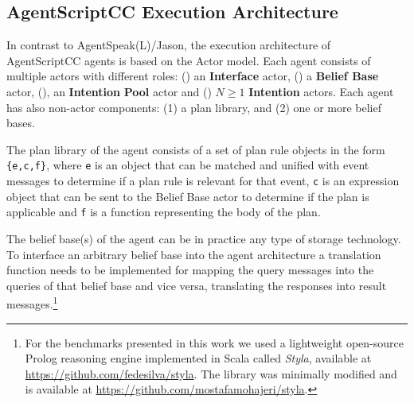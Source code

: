 \subsection{AgentScriptCC Execution Architecture}
\label{section_arch}
In contrast to AgentSpeak(L)/Jason, the execution architecture of AgentScriptCC agents is based on the Actor model. Each agent consists of multiple actors with different roles: () an \textbf{Interface} actor, () a \textbf{Belief Base} actor, (), an \textbf{Intention} \textbf{Pool} actor and () $N \ge 1$ \textbf{Intention} actors. Each agent has also non-actor components: (1) a plan library, and (2) one or more belief bases.

The plan library of the agent consists of a set of plan rule objects in the form \verb+{e,c,f}+, where \verb+e+ is an object that can be matched and unified with event messages to determine if a plan rule is relevant for that event, \verb+c+ is an expression object that can be sent to the Belief Base actor to determine if the plan is applicable and \verb+f+ is a function representing the body of the plan.

The belief base(s) of the agent can be in practice any type of storage technology. To interface an arbitrary belief base into the agent architecture a translation function needs to be implemented for mapping the query messages into the queries of that belief base and vice versa, translating the responses into result messages.\footnote{For the benchmarks presented in this work we used a lightweight open-source Prolog reasoning engine implemented in Scala called \textit{Styla}, available at \url{https://github.com/fedesilva/styla}. %
The library was minimally modified and is available at \url{https://github.com/mostafamohajeri/styla}.}

